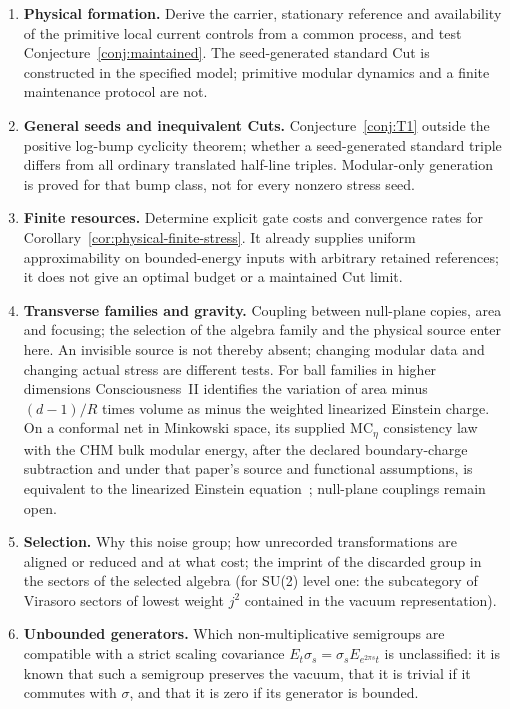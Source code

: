 \documentclass[12pt]{article}
\theoremstyle{definition}
\theoremstyle{remark}
\begin{document}
\begin{enumerate}[leftmargin=2em,itemsep=2pt]
\item \textbf{Physical formation.} Derive the carrier, stationary reference and
availability of the primitive local current controls from a common
process, and test
Conjecture~\ref{conj:maintained}. The seed-generated standard Cut is
constructed in the specified model; primitive modular dynamics and a finite
maintenance protocol are not.
\item \textbf{General seeds and inequivalent Cuts.}
Conjecture~\ref{conj:T1} outside the positive log-bump cyclicity theorem;
whether a seed-generated standard triple differs from all ordinary translated
half-line triples. Modular-only generation is proved for that bump class,
not for every nonzero stress seed.
\item \textbf{Finite resources.} Determine explicit gate costs and convergence
rates for Corollary~\ref{cor:physical-finite-stress}. It already supplies
uniform approximability on bounded-energy inputs with arbitrary retained
references; it does not give an optimal budget or a maintained Cut limit.
\item \textbf{Transverse families and gravity.} Coupling between null-plane copies,
area and focusing; the selection of the algebra family and the physical
source enter here. An invisible source is not thereby absent; changing modular
data and changing actual stress are different tests. For ball
families in higher dimensions Consciousness~II identifies the variation of area
minus $(d-1)/R$ times volume as minus the weighted linearized Einstein charge.
On a conformal net in Minkowski space, its supplied
$\mathrm{MC}_\eta$ consistency law with the CHM bulk modular energy,
after the declared boundary-charge subtraction and under that paper's
source and functional assumptions, is equivalent to the linearized
Einstein equation~\cite{PaperCII};
null-plane couplings remain open.
\item \textbf{Selection.} Why this noise group; how unrecorded transformations are
aligned or reduced and at what cost; the imprint of the discarded group in the
sectors of the selected algebra (for SU(2) level one: the subcategory of Virasoro
sectors of lowest weight \(j^2\) contained in the vacuum representation).
\item \textbf{Unbounded generators.} Which non-multiplicative semigroups are compatible
with a strict scaling covariance \(E_t\sigma_s=\sigma_sE_{e^{2\pi s}t}\) is unclassified: it
is known that such a semigroup preserves the vacuum, that it is trivial if it commutes
with \(\sigma\), and that it is zero if its generator is bounded.
\end{enumerate}
\end{document}
